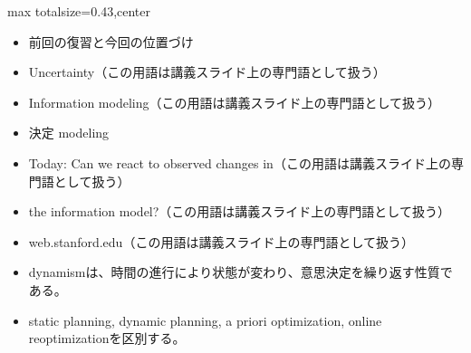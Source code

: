 \clearpage
{}
\begin{minipage}[t]{0.405\textwidth}
\begin{adjustbox}{max totalsize={\textwidth}{0.43\textheight},center}
\begin{minipage}{\textwidth}\scriptsize
{}\begin{itemize}
\item 前回の復習と今回の位置づけ
\item Uncertainty（この用語は講義スライド上の専門語として扱う）
\item Information modeling（この用語は講義スライド上の専門語として扱う）
\item 決定 modeling
\item Today: Can we react to observed changes in（この用語は講義スライド上の専門語として扱う）
\item the information model?（この用語は講義スライド上の専門語として扱う）
\item web.stanford.edu（この用語は講義スライド上の専門語として扱う）
\end{itemize}\begin{itemize}
\item dynamismは、時間の進行により状態が変わり、意思決定を繰り返す性質である。
\item static planning, dynamic planning, a priori optimization, online reoptimizationを区別する。
\end{itemize}
\end{minipage}
\end{adjustbox}
\end{minipage}\hfill
